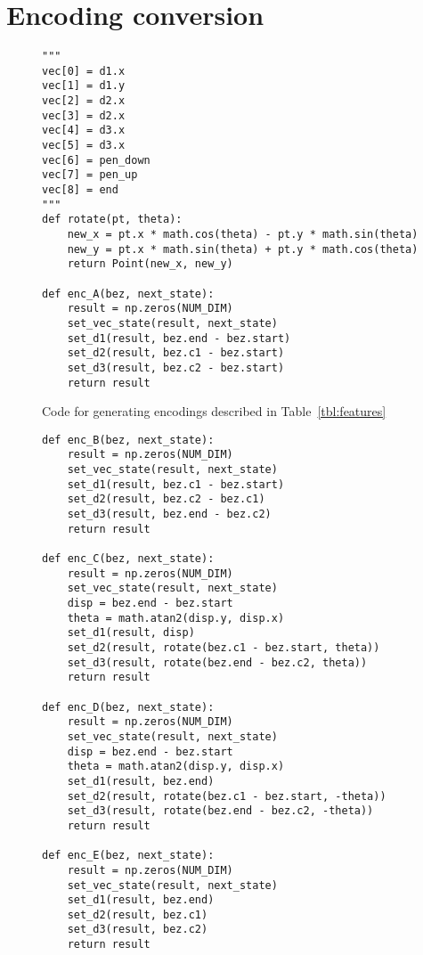 \chapter{Encoding conversion}\label{app:enc}

\begin{figure}[h]
    \caption{Code for generating encodings described in Table~\ref{tbl:features}\label{appfig:features-code}}
\begin{verbatim}
"""
vec[0] = d1.x
vec[1] = d1.y
vec[2] = d2.x
vec[3] = d2.x
vec[4] = d3.x
vec[5] = d3.x
vec[6] = pen_down
vec[7] = pen_up
vec[8] = end
"""
def rotate(pt, theta):
    new_x = pt.x * math.cos(theta) - pt.y * math.sin(theta)
    new_y = pt.x * math.sin(theta) + pt.y * math.cos(theta)
    return Point(new_x, new_y)

def enc_A(bez, next_state):
    result = np.zeros(NUM_DIM)
    set_vec_state(result, next_state)
    set_d1(result, bez.end - bez.start)
    set_d2(result, bez.c1 - bez.start)
    set_d3(result, bez.c2 - bez.start)
    return result
\end{verbatim}
\end{figure}

\begin{figure}[h]
\begin{verbatim}
def enc_B(bez, next_state):
    result = np.zeros(NUM_DIM)
    set_vec_state(result, next_state)
    set_d1(result, bez.c1 - bez.start)
    set_d2(result, bez.c2 - bez.c1)
    set_d3(result, bez.end - bez.c2)
    return result

def enc_C(bez, next_state):
    result = np.zeros(NUM_DIM)
    set_vec_state(result, next_state)
    disp = bez.end - bez.start
    theta = math.atan2(disp.y, disp.x)
    set_d1(result, disp)
    set_d2(result, rotate(bez.c1 - bez.start, theta))
    set_d3(result, rotate(bez.end - bez.c2, theta))
    return result

def enc_D(bez, next_state):
    result = np.zeros(NUM_DIM)
    set_vec_state(result, next_state)
    disp = bez.end - bez.start
    theta = math.atan2(disp.y, disp.x)
    set_d1(result, bez.end)
    set_d2(result, rotate(bez.c1 - bez.start, -theta))
    set_d3(result, rotate(bez.end - bez.c2, -theta))
    return result

def enc_E(bez, next_state):
    result = np.zeros(NUM_DIM)
    set_vec_state(result, next_state)
    set_d1(result, bez.end)
    set_d2(result, bez.c1)
    set_d3(result, bez.c2)
    return result
\end{verbatim}
\end{figure}

\clearpage
\newpage
